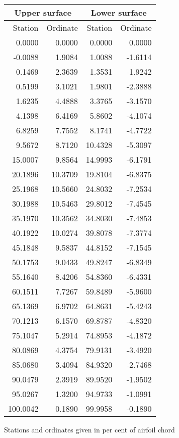 \documentclass[11pt]{book}
\begin{document}
 \hspace{4mm}
 \begin{tabular}{|r|r|r|r|} \hline 
 \multicolumn{2}{|c|}{Upper surface} & \multicolumn{2}{|c|}{Lower surface} \\
 \hline
 Station & Ordinate & Station & Ordinate \\
 \hline
0.0000 & 0.0000 & 0.0000 & 0.0000 \\
-0.0088 & 1.9084 & 1.0088 & -1.6114 \\
0.1469 & 2.3639 & 1.3531 & -1.9242 \\
0.5199 & 3.1021 & 1.9801 & -2.3888 \\
1.6235 & 4.4888 & 3.3765 & -3.1570 \\
4.1398 & 6.4169 & 5.8602 & -4.1074 \\
6.8259 & 7.7552 & 8.1741 & -4.7722 \\
9.5672 & 8.7120 & 10.4328 & -5.3097 \\
15.0007 & 9.8564 & 14.9993 & -6.1791 \\
20.1896 & 10.3709 & 19.8104 & -6.8375 \\
25.1968 & 10.5660 & 24.8032 & -7.2534 \\
30.1988 & 10.5463 & 29.8012 & -7.4545 \\
35.1970 & 10.3562 & 34.8030 & -7.4853 \\
40.1922 & 10.0274 & 39.8078 & -7.3774 \\
45.1848 & 9.5837 & 44.8152 & -7.1545 \\
50.1753 & 9.0433 & 49.8247 & -6.8349 \\
55.1640 & 8.4206 & 54.8360 & -6.4331 \\
60.1511 & 7.7267 & 59.8489 & -5.9600 \\
65.1369 & 6.9702 & 64.8631 & -5.4243 \\
70.1213 & 6.1570 & 69.8787 & -4.8320 \\
75.1047 & 5.2914 & 74.8953 & -4.1872 \\
80.0869 & 4.3754 & 79.9131 & -3.4920 \\
85.0680 & 3.4094 & 84.9320 & -2.7468 \\
90.0479 & 2.3919 & 89.9520 & -1.9502 \\
95.0267 & 1.3200 & 94.9733 & -1.0991 \\
100.0042 & 0.1890 & 99.9958 & -0.1890 \\
 \hline 
 \end{tabular}
 \vspace{8mm}

Stations and ordinates given in per cent of airfoil chord
\end{document}
